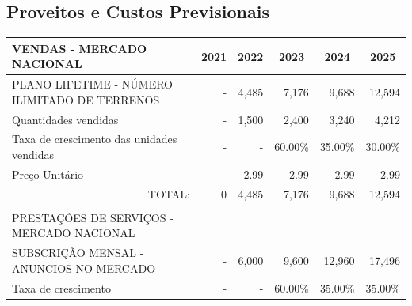 \documentclass[11pt]{article}
\begin{document}
	\pagebreak
	
	\large
	\subsection{Proveitos e Custos Previsionais}
	
	\normalsize
	
	\begin{adjustbox}{center}
		\begin{tabular}{|l|r|r|r|r|r|}
			\multicolumn{1}{l}{VENDAS - MERCADO NACIONAL} & \multicolumn{1}{c}{2021} & \multicolumn{1}{c}{2022} & \multicolumn{1}{c}{2023} & \multicolumn{1}{c}{2024} & \multicolumn{1}{c}{2025} \\ \hline
			PLANO LIFETIME - NÚMERO ILIMITADO DE TERRENOS  & - & 4,485                    & 7,176                  & 9,688                   & 12,594                   \\ \hline
			Quantidades vendidas                           &                -          & 1,500                    & 2,400                    & 3,240                    & 4,212                    \\ \hline
			Taxa de crescimento das unidades vendidas      &           -               & -                  & 60.00\%                  & 35.00\%                  & 30.00\%                  \\ \hline
			Preço Unitário                                 &         -                 & 2.99                     & 2.99                     & 2.99                     & 2.99                     \\ \hline
			\multicolumn{1}{r}{TOTAL:} & \multicolumn{1}{r}{0} & \multicolumn{1}{r}{4,485} & \multicolumn{1}{r}{7,176} & \multicolumn{1}{r}{9,688} & \multicolumn{1}{r}{12,594} \\
			\multicolumn{1}{l}{} & \multicolumn{1}{l}{} & \multicolumn{1}{l}{} & \multicolumn{1}{l}{} & \multicolumn{1}{l}{} & \multicolumn{1}{l}{} \\
			\multicolumn{1}{l}{PRESTAÇÕES DE SERVIÇOS - MERCADO NACIONAL} & \multicolumn{1}{l}{}& \multicolumn{1}{l}{} & \multicolumn{1}{l}{} & \multicolumn{1}{l}{} & \multicolumn{1}{l}{}\\ \hline
			SUBSCRIÇÃO MENSAL - ANUNCIOS NO MERCADO        &     -                     & 6,000                    & 9,600                   & 12,960                   & 17,496                   \\ \hline
			Taxa de crescimento                            &         -                 &               -           & 60.00\%                  & 35.00\%                  & 35.00\%                  \\ \hline

\end{tabular}
\end{adjustbox}
\end{document}

